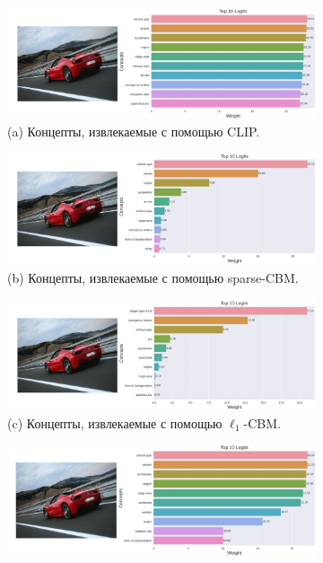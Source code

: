 \begin{figure}[h] %
\centering
   \begin{subfigure}%
     \centering
    \includegraphics[width=0.75\linewidth]{./figures/clip_im_2-compressed.png}
    \\
    (a) Концепты, извлекаемые с помощью CLIP.
    \end{subfigure}
    \begin{subfigure}%
    \centering
      \includegraphics[width=0.75\linewidth]{./figures/sparse_im_2-compressed.png}
    \\
    (b) Концепты, извлекаемые с помощью sparse-CBM.
    \end{subfigure}
    \begin{subfigure}%
     \centering
  \includegraphics[width=0.75\linewidth]{./figures/l1_im_2-compressed.png}
    \\
    (c) Концепты, извлекаемые с помощью $\ell_1$-CBM.
    \end{subfigure}
        \begin{subfigure}%
     \centering
  \includegraphics[width=0.75\linewidth]{./figures/contr_im_2-compressed.png}

\end{subfigure}
\end{figure}
